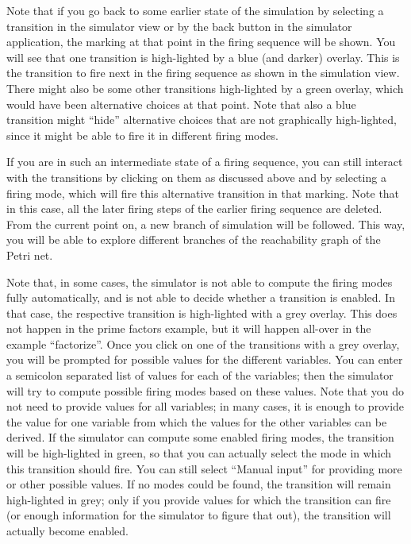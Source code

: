 Note that if you go back to some earlier state of the simulation by
selecting a transition in the simulator view or by the back button in
the simulator application, the marking at that point in the firing sequence
will be shown. You will see that one transition is high-lighted by a
blue (and darker) overlay. This is the transition to fire next in the
firing sequence as shown in the simulation view. There might also be
some other transitions high-lighted by a green overlay, which would
have been alternative choices at that point. Note that also a blue
transition might ``hide'' alternative choices that are not graphically
high-lighted, since it might be able to fire it in different firing modes.

If you are in such an intermediate state of a firing sequence, you can
still interact with the transitions by clicking on them as discussed
above and by selecting a firing mode, which will fire this alternative
transition in that marking. Note that in this case, all the later firing steps
of the earlier firing sequence are deleted.
From the current point on, a new branch of simulation will be followed.
This way, you will be able to explore different branches of the reachability
graph of the Petri net.

Note that, in some cases, the simulator is not able to compute the firing modes
fully automatically, and is not able to decide whether a transition is enabled.
In that case, the respective transition is high-lighted with a grey overlay.
This does not happen in the prime factors example, but it will happen all-over
in the example ``factorize''. Once you click on one of the transitions with a
grey overlay, you will be prompted for possible values for the different
variables. You can enter a semicolon separated list of values for each of the
variables; then the simulator will try to compute possible firing modes based on
these values.  Note that you do not need to provide values for all variables; in
many cases, it is enough to provide the value for one variable from which the
values for the other variables can be derived.  If the simulator can compute
some enabled firing modes, the transition will be high-lighted in green, so that you can
actually select the mode in which this transition should fire. You can still select
``Manual input'' for providing more or other possible values.
If no modes could be found, the transition will remain high-lighted in grey;
only if you provide values for which the transition can fire (or enough
information for the simulator to figure that out), the transition will actually
become enabled.

